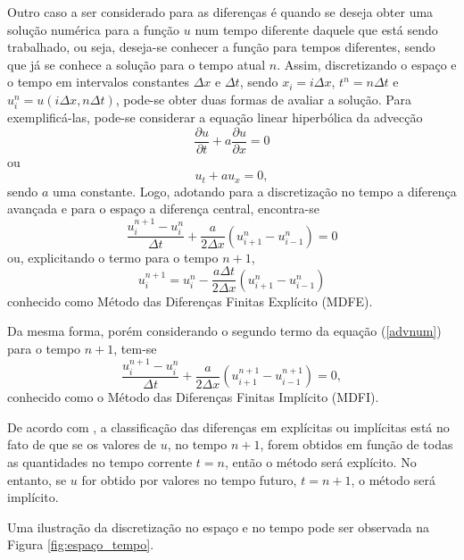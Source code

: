 Outro caso a ser considerado para as diferenças é quando se deseja obter uma solução numérica para a função $u$ num tempo diferente daquele que está sendo trabalhado, ou seja, deseja-se conhecer a função para tempos diferentes, sendo que já se conhece a solução para o tempo atual $n$. Assim, discretizando o espaço e o tempo em intervalos constantes $ \Delta x$ e $ \Delta t$, sendo $x_i = i \Delta x$, $t^n = n \Delta t$ e $ u^{n}_{i} = u( i \Delta x, n \Delta t)$, pode-se obter duas formas de avaliar a solução. Para exemplificá-las, pode-se considerar a equação linear hiperbólica da advecção
\begin{equation}
\frac{ \partial u}{ \partial t} + a \frac{ \partial u}{ \partial x} = 0
\end{equation}
ou
\begin{equation} \label{advecção}
u_t + au_x = 0,
\end{equation}
sendo $a$ uma constante. Logo, adotando para a discretização no tempo a diferença avançada e para o espaço a diferença central, encontra-se
\begin{equation} \label{advnum}
\frac{ u^{n+1}_{i} - u^{n}_{i}}{ \Delta t} + \frac{a}{2 \Delta x} \left( u^{n}_{i+1} - u^{n}_{i-1} \right) = 0
\end{equation}
ou, explicitando o termo para o tempo $n+1$, 
\begin{equation} \label{explícito}
u^{n+1}_{i} =  u^{n}_{i} - \frac{a \Delta t}{2 \Delta x} \left( u^{n}_{i+1} - u^{n}_{i-1} \right) 
\end{equation} 
conhecido como Método das Diferenças Finitas Explícito (MDFE).

Da mesma forma, porém considerando o segundo termo da equação (\ref{advnum}) para o tempo $n+1$, tem-se
\begin{equation}
\frac{ u^{n+1}_{i} - u^{n}_{i}}{ \Delta t} + \frac{a}{2 \Delta x} \left( u^{n+1}_{i+1} - u^{n+1}_{i-1} \right) = 0,
\end{equation}
conhecido como o Método das Diferenças Finitas Implícito (MDFI).

De acordo com , a classificação das diferenças em explícitas ou implícitas está no fato de que se os valores de $u$, no tempo $n+1$, forem obtidos em função de todas as quantidades no tempo corrente $t=n$, então o método será explícito. No entanto, se $u$ for obtido por valores no tempo futuro, $t=n+1$, o método será implícito.

Uma ilustração da discretização no espaço e no tempo pode ser observada na Figura \ref{fig:espaço_tempo}.

